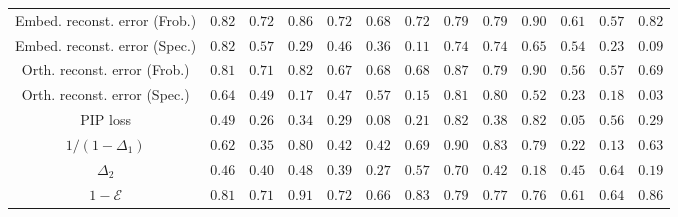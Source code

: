 \begin{table}
\begin{tabular}{c | c | c | c | c | c | c | c | c | c | c | c | c}
		Embed. reconst. error (Frob.) &  $0.82$&$0.72$&$0.86$  &  $0.72$&$0.68$&$0.72$  &  $0.79$&$0.79$&$0.90$  &  $0.61$&$0.57$&$0.82$  \\
		Embed. reconst. error (Spec.) &  $0.82$&$0.57$&$0.29$  &  $0.46$&$0.36$&$0.11$  &  $0.74$&$0.74$&$0.65$  &  $0.54$&$0.23$&$0.09$  \\
		Orth. reconst. error (Frob.) &  $0.81$&$0.71$&$0.82$  &  $0.67$&$0.68$&$0.68$  &  $0.87$&$0.79$&$0.90$  &  $0.56$&$0.57$&$0.69$  \\
		Orth. reconst. error (Spec.) &  $0.64$&$0.49$&$0.17$  &  $0.47$&$0.57$&$0.15$  &  $0.81$&$0.80$&$0.52$  &  $0.23$&$0.18$&$0.03$  \\
		PIP loss &  $0.49$&$0.26$&$0.34$  &  $0.29$&$0.08$&$0.21$  &  $0.82$&$0.38$&$\mathbf{0.82}$  &  $0.05$&$0.56$&$0.29$  \\  
		$1/(1-\Delta_1)$ &  $0.62$&$0.35$&$0.80$  &  $0.42$&$0.42$&$0.69$  &  $\mathbf{0.90}$&$\mathbf{0.83}$&$0.79$  &  $0.22$&$0.13$&$0.63$  \\  
		$\Delta_2$ &  $0.46$&$0.40$&$0.48$  &  $0.39$&$0.27$&$0.57$  &  $0.70$&$0.42$&$0.18$  &  $0.45$&$0.64$&$0.19$  \\  
		$1 - \mathcal{E}$ & $\mathbf{0.81}$&$\mathbf{0.71}$&$\mathbf{0.91}$  &  $\mathbf{0.72}$&$\mathbf{0.66}$&$\mathbf{0.83}$  &  $0.79$&$0.77$&$0.76$  &  $\mathbf{0.61}$&$\mathbf{0.64}$&$\mathbf{0.86}$  \\  
		\bottomrule
	\end{tabular}
	\label{tab:sp_rank}
\end{table}

